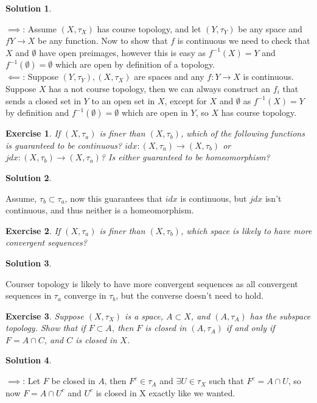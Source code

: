 \documentclass[11pt,a4paper]{article}
\newtheorem{Ex}{Exercise}
\newtheorem{Sol}{Solution}
\begin{document}
\begin{Sol} \end{Sol}
\noindent $\implies$: Assume $(X, \tau_X)$ has course topology, and let $(Y, \tau_Y)$ be any space and $f Y \rightarrow X$ be any function. Now to show that $f$ is continuous we need to check that $X$ and $\emptyset$ have open preimages, however this is easy as $f^{-1}(X) = Y$ and $f^{-1}(\emptyset) = \emptyset$ which are open by definition of a topology. \\
\noindent $\impliedby$: Suppose $(Y, \tau_Y), (X, \tau_X)$ are spaces and any $f: Y \rightarrow X$ is continuous. Suppose $X$ has a not course topology, then we can always construct an $f_i$ that sends a closed set in $Y$ to an open set in $X$, except for $X$ and $\emptyset$ as $f^{-1}(X) = Y$ by definition and $f^{-1}(\emptyset) = \emptyset$ which are open in $Y$, so $X$ has course topology.
\begin{Ex}
	If $(X, \tau_a)$ is finer than $(X, \tau_b)$, which of the following functions is guaranteed to be continuous? $idx : (X , \tau_a) \rightarrow (X, \tau_b)$ or $jdx : (X , \tau_b) \rightarrow (X, \tau_a)$? Is either guaranteed to be homeomorphism?
\end{Ex}

\begin{Sol} \end{Sol}
Assume, $\tau_b \subset \tau_a$, now this guarantees that $idx$ is continuous, but $jdx$ isn't continuous, and thus neither is a homeomorphism.

\begin{Ex}
	If $(X, \tau_a)$ is finer than $(X, \tau_b)$, which space is likely to have more convergent sequences?
\end{Ex}

\begin{Sol} \end{Sol}
\noindent Courser topology is likely to have more convergent sequences as all convergent sequences in $\tau_a$ converge in $\tau_b$, but the converse doesn't need to hold. 

\begin{Ex}
	Suppose $(X, \tau_X)$ is a space, $A \subset X$, and $(A, \tau_A)$ has the subspace topology. Show that if $F \subset A$, then $F$ is closed in $(A, \tau_A)$ if and only if $F = A \cap C$, and $C$ is closed in $X$.  
\end{Ex}

\begin{Sol} \end{Sol}
\noindent $\implies$: Let $F$ be closed in $A$, then $F^c \in \tau_A$ and $\exists U \in \tau_X$ such that $F^c = A \cap U$, so now $F = A \cap U^c$ and $U^c$ is closed in X exactly like we wanted.
\end{document}

